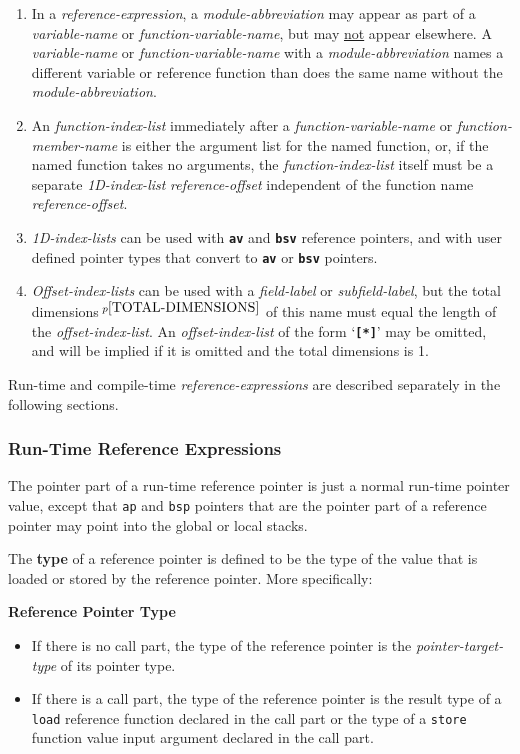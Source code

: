 \documentclass[12pt]{article}
\newcommand{\TT}[1]{{\tt \bfseries #1}}
\newcommand{\key}[1]{{\rm \bfseries #1}}
\newcommand{\pagnote}[1]{$\,^{p\pageref{#1}}$}
\newenvironment{indpar}[1][0.3in]%
	{\begin{list}{}%
		     {\setlength{\itemsep}{0in}%
		      \setlength{\topsep}{0in}%
		      \setlength{\parsep}{1ex}%
		      \setlength{\labelwidth}{#1}%
		      \setlength{\leftmargin}{#1}%
		      \addtolength{\leftmargin}{\labelsep}}%
	 \item}%
	{\end{list}}
\begin{document}
\begin{indpar}
\begin{enumerate}
\item In a {\em reference-expression},
a {\em module-abbreviation} may appear as part of a
{\em variable-name} or {\em function-variable-name},
but may \underline{not} appear elsewhere.
A {\em variable-name} or {\em function-variable-name}
with a {\em module-abbreviation}
names a different variable or reference function than does the same
name without the {\em module-abbreviation}.
\item
An {\em function-index-list} immediately after a {\em function-variable-name}
or {\em function-member-name} is either the argument list for the named
function, or, if the named function takes no arguments,
the {\em function-index-list}
itself must be a separate {\em 1D-index-list}
{\em reference-offset} independent of the function name {\em reference-offset}.
\item
{\em 1D-index-lists} can be used with \TT{av} and \TT{bsv} reference pointers,
and with user defined pointer types that convert to \TT{av} or \TT{bsv}
pointers.
\item
{\em Offset-index-lists} can be used with a {\em field-label}
or {\em subfield-label}, but the total dimensions\pagnote{TOTAL-DIMENSIONS}
of this name must equal
the length of the {\em offset-index-list}.  An {\em offset-index-list}
of the form `\TT{[*]}' may be omitted, and will be implied if it is omitted
and the total dimensions is 1.

\end{enumerate}
\end{indpar}

Run-time and compile-time {\em reference-expressions} are described
separately in the following sections.

\subsubsection{Run-Time Reference Expressions}
\label{RUN-TIME-REFERENCE-EXPRESSIONS}

The pointer part of a run-time reference pointer is just
a normal run-time pointer value, except that
{\tt ap} and {\tt bsp} pointers that are the pointer part
of a reference pointer may point
into the global or local stacks.

The \key{type} of a reference pointer
is defined to be the type of the value
that is loaded or stored by the reference pointer.  More specifically:

\bigskip

\centerline{\bf Reference Pointer Type}\label{REFERENCE-POINTER-TYPE}
\begin{itemize}
\item If there is no call part,
the type of the reference pointer is the {\em pointer-target-type} of its
pointer type.
\item If there is a call part,
the type of the reference pointer is the result type of a {\tt load}
reference function declared in the call part or the type of a {\tt store}
function value input argument declared in the call part.
\end{itemize}
\end{document}
